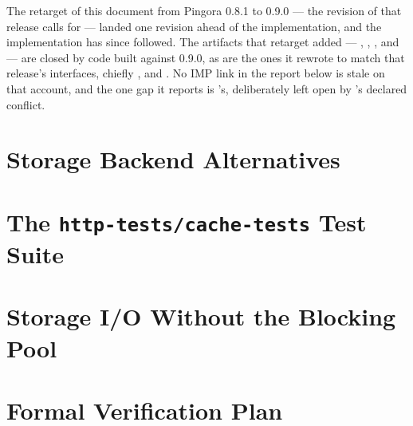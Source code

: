 \documentclass[a4paper]{report}
\begin{document}
The retarget of this document from Pingora 0.8.1 to 0.9.0 --- the revision of
 that release calls for --- landed one revision
ahead of the implementation, and the implementation has since followed. The
artifacts that retarget added --- ,
, ,
 and  --- are
closed by code built against 0.9.0, as are the ones it rewrote to match that
release's interfaces, chiefly ,
 and .
No \textsf{IMP} link in the report below is stale on that account, and the one
gap it reports is 's, deliberately
left open by 's declared conflict.


\appendix

\chapter{Storage Backend Alternatives}
\label{app:alternatives}


\chapter{The \texttt{http-tests/cache-tests} Test Suite}
\label{app:cache-tests}


\chapter{Storage I/O Without the Blocking Pool}
\label{app:executor}


\chapter{Formal Verification Plan}
\label{app:verification}

\end{document}
